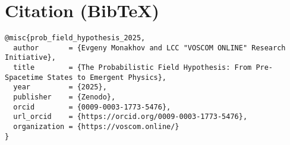\documentclass[12pt,a4paper]{article}
\begin{document}
\section*{Citation (BibTeX)}
\begin{verbatim}
@misc{prob_field_hypothesis_2025,
  author       = {Evgeny Monakhov and LCC "VOSCOM ONLINE" Research Initiative},
  title        = {The Probabilistic Field Hypothesis: From Pre-Spacetime States to Emergent Physics},
  year         = {2025},
  publisher    = {Zenodo},
  orcid        = {0009-0003-1773-5476},
  url_orcid    = {https://orcid.org/0009-0003-1773-5476},
  organization = {https://voscom.online/}
}
\end{verbatim}
\end{document}
